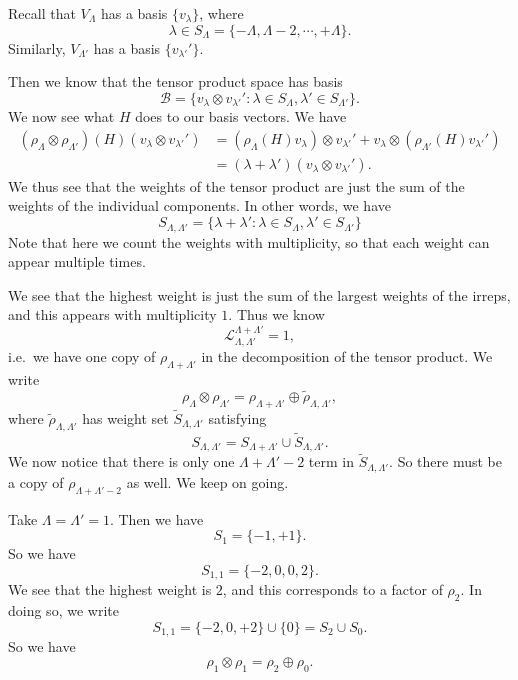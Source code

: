 \documentclass[a4paper]{article}
\begin{document}
Recall that $V_\Lambda$ has a basis $\{v_\lambda\}$, where
\[
  \lambda \in S_\Lambda = \{-\Lambda, \Lambda - 2, \cdots, + \Lambda\}.
\]
Similarly, $V_{\Lambda'}$ has a basis $\{v_{\lambda'}'\}$.

Then we know that the tensor product space has basis
\[
  \mathcal{B} = \{v_\lambda \otimes v_{\lambda'}': \lambda \in S_{\Lambda}, \lambda' \in S_{\Lambda'}\}.
\]
We now see what $H$ does to our basis vectors. We have
\begin{align*}
  (\rho_\Lambda \otimes \rho_{\Lambda'})(H)(v_\lambda \otimes v_{\lambda'}') &= (\rho_\Lambda(H)v_\lambda) \otimes v_{\lambda'}' + v_\lambda \otimes (\rho_{\Lambda'}(H)v_{\lambda'}')\\
  &= (\lambda + \lambda')(v_\lambda \otimes v_{\lambda'}').
\end{align*}
We thus see that the weights of the tensor product are just the sum of the weights of the individual components. In other words, we have
\[
  S_{\Lambda, \Lambda'} = \{\lambda + \lambda': \lambda \in S_\Lambda, \lambda' \in S_{\Lambda'}\}
\]
Note that here we count the weights with multiplicity, so that each weight can appear multiple times.

We see that the highest weight is just the sum of the largest weights of the irreps, and this appears with multiplicity $1$. Thus we know
\[
  \mathcal{L}_{\Lambda, \Lambda'}^{\Lambda + \Lambda'} = 1,
\]
i.e.\ we have one copy of $\rho_{\Lambda + \Lambda'}$ in the decomposition of the tensor product. We write
\[
  \rho_\Lambda \otimes \rho_{\Lambda'} = \rho_{\Lambda + \Lambda'} \oplus \tilde{\rho}_{\Lambda, \Lambda'},
\]
where $\tilde{\rho}_{\Lambda, \Lambda'}$ has weight set $\tilde{S}_{\Lambda, \Lambda'}$ satisfying
\[
  S_{\Lambda, \Lambda'} = S_{\Lambda + \Lambda'} \cup \tilde{S}_{\Lambda, \Lambda'}.
\]
We now notice that there is only one $\Lambda + \Lambda' - 2$ term in $\tilde{S}_{\Lambda, \Lambda'}$. So there must be a copy of $\rho_{\Lambda + \Lambda' - 2}$ as well. We keep on going.

\begin{eg}
  Take $\Lambda = \Lambda' = 1$. Then we have
  \[
    S_1 = \{-1, +1\}.
  \]
  So we have
  \[
    S_{1, 1} = \{-2, 0, 0, 2\}.
  \]
  We see that the highest weight is $2$, and this corresponds to a factor of $\rho_2$. In doing so, we write
  \[
    S_{1, 1} = \{-2, 0, +2\} \cup \{0\} = S_2 \cup S_0.
  \]
  So we have
  \[
    \rho_1 \otimes \rho_1 = \rho_2 \oplus \rho_0.
  \]
\end{eg}
\end{document}

